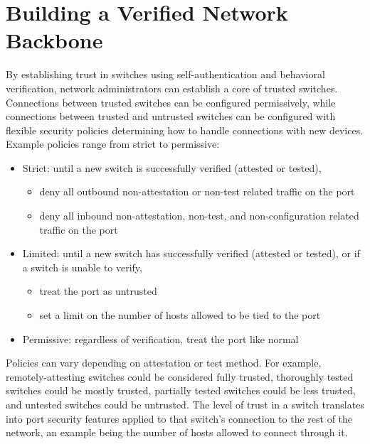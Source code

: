 \documentclass[journal]{IEEEtran}
\begin{document}
\section{Building a Verified Network Backbone} \label{sec:policies}
By establishing trust in switches using self-authentication and behavioral verification, network
administrators can establish a core of trusted switches. Connections between trusted switches can
be configured permissively, while connections between trusted and untrusted switches can be
configured with flexible security policies determining how to handle connections with new devices.
Example policies range from strict to permissive:
\begin{itemize}
  \item Strict: until a new switch is successfully verified (attested or tested),
  \begin{itemize}
    \item deny all outbound non-attestation or non-test related traffic on the port
    \item deny all inbound non-attestation, non-test, and non-configuration related traffic on the
    port
  \end{itemize}
  \item Limited: until a new switch has successfully verified (attested or tested), or if a switch
  is unable to verify,
  \begin{itemize}
    \item treat the port as untrusted
    \item set a limit on the number of hosts allowed to be tied to the port
  \end{itemize}
  \item Permissive: regardless of verification, treat the port like normal
\end{itemize}

Policies can vary depending on attestation or test method. For example, remotely-attesting switches
could be considered fully trusted, thoroughly tested switches could be mostly trusted, partially
tested switches could be less trusted, and untested switches could be untrusted. The level of trust
in a switch translates into port security features applied to that switch's connection to the rest
of the network, an example being the number of hosts allowed to connect through it.

\end{document}
